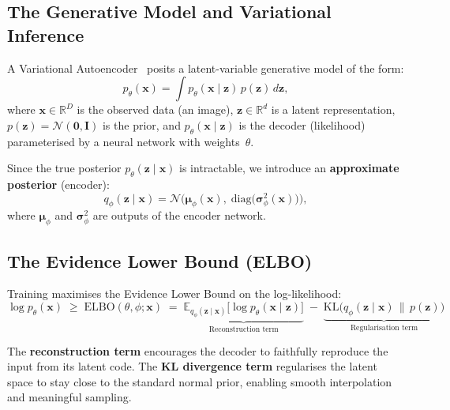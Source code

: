 \documentclass[11pt, a4paper]{article}
\newcommand{\KL}{\mathrm{KL}}
\newcommand{\ELBO}{\mathrm{ELBO}}
\newcommand{\reals}{\mathbb{R}}
\newcommand{\E}{\mathbb{E}}
\newcommand{\N}{\mathcal{N}}
\begin{document}
\subsection{The Generative Model and Variational Inference}

A Variational Autoencoder~\cite{kingma2014vae, reznik2014vae} posits a latent-variable generative model of the form:
\begin{equation}
  p_\theta(\mathbf{x}) = \int p_\theta(\mathbf{x} \mid \mathbf{z})\, p(\mathbf{z})\, d\mathbf{z},
  \label{eq:generative_model}
\end{equation}
where \(\mathbf{x} \in \reals^D\) is the observed data (an image), \(\mathbf{z} \in \reals^d\) is a latent representation, \(p(\mathbf{z}) = \N(\mathbf{0}, \mathbf{I})\) is the prior, and \(p_\theta(\mathbf{x} \mid \mathbf{z})\) is the decoder (likelihood) parameterised by a neural network with weights~\(\theta\).

Since the true posterior \(p_\theta(\mathbf{z} \mid \mathbf{x})\) is intractable, we introduce an \textbf{approximate posterior} (encoder):
\begin{equation}
  q_\phi(\mathbf{z} \mid \mathbf{x}) = \N\!\big(\boldsymbol{\mu}_\phi(\mathbf{x}),\; \mathrm{diag}\!\big(\boldsymbol{\sigma}_\phi^2(\mathbf{x})\big)\big),
  \label{eq:encoder}
\end{equation}
where \(\boldsymbol{\mu}_\phi\) and \(\boldsymbol{\sigma}_\phi^2\) are outputs of the encoder network.

\subsection{The Evidence Lower Bound (ELBO)}

Training maximises the Evidence Lower Bound on the log-likelihood:
\begin{equation}
  \boxed{
    \log p_\theta(\mathbf{x}) \;\geq\; \ELBO(\theta, \phi; \mathbf{x})
    \;=\; \underbrace{\E_{q_\phi(\mathbf{z} \mid \mathbf{x})}\!\big[\log p_\theta(\mathbf{x} \mid \mathbf{z})\big]}_{\text{Reconstruction term}}
    \;-\; \underbrace{\KL\!\big(q_\phi(\mathbf{z} \mid \mathbf{x}) \,\|\, p(\mathbf{z})\big)}_{\text{Regularisation term}}
  }
  \label{eq:elbo}
\end{equation}

The \textbf{reconstruction term} encourages the decoder to faithfully reproduce the input from its latent code. The \textbf{KL divergence term} regularises the latent space to stay close to the standard normal prior, enabling smooth interpolation and meaningful sampling.
\end{document}
